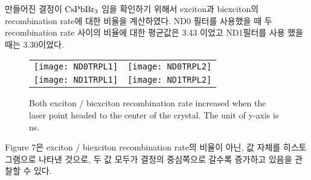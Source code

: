 만들어진 결정이 $\rm{CsPbBr_3}$ 임을 확인하기 위해서 exciton과 biexciton의 recombination rate에 대한 비율을 계산하였다. 
ND0 필터를 사용했을 때 두 recombination rate 사이의 비율에 대한 평균값은 3.43 이었고 ND1필터를 사용 했을 때는 3.30이었다.
\clearpage
\begin{figure}[h]
	\begin{center}
		\begin{tabular}{cc}
			\texttt{[image: ND0TRPL1]} &
			\texttt{[image: ND0TRPL2]}\\
			\texttt{[image: ND1TRPL1]} &
			\texttt{[image: ND1TRPL2]}
		\end{tabular}
		\caption{Both exciton / biexciton recombination rate increased when the laser point headed to the center of the crystal. The unit of y-axis is ns.}	
		\label{fig:FIR221}
	\end{center}
\end{figure}
Figure 7은 exciton / biexciton recombination rate의 비율이 아닌, 값 자체를 히스토그램으로 나타낸 것으로, 두 값 모두가 결정의 중심쪽으로 갈수록 증가하고 있음을 관찰할 수 있다. 
